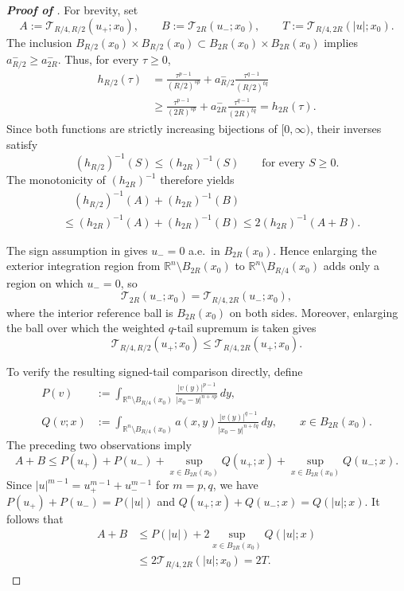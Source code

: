 \documentclass[10pt,a4paper]{amsart}
\newcommand{\R}{\mathbb R}
\newcommand{\calT}{\mathcal T}
\newcommand{\dd}{\,d}
\theoremstyle{plain}
\theoremstyle{definition}
\theoremstyle{remark}
\begin{document}
\begin{proof}[\textbf{Proof of }]
For brevity, set
\[
    A:=\calT_{R/4,R/2}(u_+;x_0),
    \qquad
    B:=\calT_{2R}(u_-;x_0),
    \qquad
    T:=\calT_{R/4,2R}(|u|;x_0).
\]
The inclusion \(B_{R/2}(x_0)\times B_{R/2}(x_0)\subset B_{2R}(x_0)\times B_{2R}(x_0)\) implies \(a_{R/2}^-\ge a_{2R}^-\).  Thus, for every $\tau\ge0$,
\[
\begin{aligned}
    h_{R/2}(\tau)
    &=\frac{\tau^{p-1}}{(R/2)^{sp}}
      +a_{R/2}^-\frac{\tau^{q-1}}{(R/2)^{tq}}\\
    &\ge
      \frac{\tau^{p-1}}{(2R)^{sp}}
      +a_{2R}^-\frac{\tau^{q-1}}{(2R)^{tq}}
      =h_{2R}(\tau).
\end{aligned}
\]
Since both functions are strictly increasing bijections of
\([0,\infty)\), their inverses satisfy
\[
    (h_{R/2})^{-1}(S)\le (h_{2R})^{-1}(S)
    \qquad\text{for every }S\ge0.
\]
The monotonicity of \((h_{2R})^{-1}\) therefore yields
\begin{equation}\label{eq:inverse-tail-comparison}
\begin{aligned}
    &\quad(h_{R/2})^{-1}(A)+(h_{2R})^{-1}(B)\\
    &\le
    (h_{2R})^{-1}(A)+(h_{2R})^{-1}(B)
    \le 2(h_{2R})^{-1}(A+B).
\end{aligned}
\end{equation}

The sign assumption in  gives \(u_-=0\) a.e.\ in
\(B_{2R}(x_0)\). Hence enlarging the exterior integration region from
\(\R^n\setminus B_{2R}(x_0)\) to \(\R^n\setminus B_{R/4}(x_0)\) adds only a region on which \(u_-=0\), so
\[
    \calT_{2R}(u_-;x_0)
    =\calT_{R/4,2R}(u_-;x_0),
\]
where the interior reference ball is \(B_{2R}(x_0)\) on both sides. Moreover, enlarging the ball over which the weighted \(q\)-tail supremum
is taken gives
\[
    \calT_{R/4,R/2}(u_+;x_0)
    \le \calT_{R/4,2R}(u_+;x_0).
\]

To verify the resulting signed-tail comparison directly, define
\[
\begin{aligned}
    P(v)
    &:={}
      \int_{\R^n\setminus B_{R/4}(x_0)}
      \frac{|v(y)|^{p-1}}{|x_0-y|^{n+sp}}\dd y,\\
    Q(v;x)
    &:={}
      \int_{\R^n\setminus B_{R/4}(x_0)}
      a(x,y)\frac{|v(y)|^{q-1}}{|x_0-y|^{n+tq}}\dd y,
      \qquad x\in B_{2R}(x_0).
\end{aligned}
\]
The preceding two observations imply
\[
    A+B
    \le P(u_+)+P(u_-)+
       \sup_{x\in B_{2R}(x_0)}Q(u_+;x)
       +\sup_{x\in B_{2R}(x_0)}Q(u_-;x).
\]
Since \(|u|^{m-1}=u_+^{m-1}+u_-^{m-1}\) for \(m=p,q\), we have
\(P(u_+)+P(u_-)=P(|u|)\) and
\(Q(u_+;x)+Q(u_-;x)=Q(|u|;x)\). It follows that
\begin{equation}\label{eq:signed-tail-comparison}
\begin{aligned}
    A+B
    &\le P(|u|)+2\sup_{x\in B_{2R}(x_0)}Q(|u|;x)\\
    &\le2\calT_{R/4,2R}(|u|;x_0)=2T.
\end{aligned}
\end{equation}


\end{proof}
\end{document}
